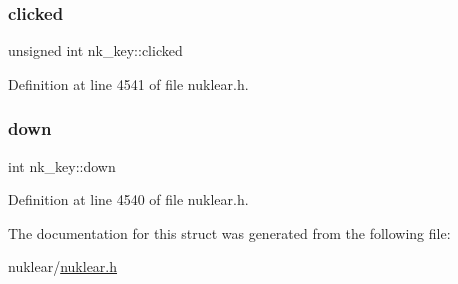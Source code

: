 \subsubsection{\texorpdfstring{clicked}{clicked}}
{\footnotesize\ttfamily unsigned int nk\+\_\+key\+::clicked}



Definition at line 4541 of file nuklear.\+h.

\mbox{\label{structnk__key_ad31180f5548bfca7a9998de792ef96b2}} 
\subsubsection{\texorpdfstring{down}{down}}
{\footnotesize\ttfamily int nk\+\_\+key\+::down}



Definition at line 4540 of file nuklear.\+h.



The documentation for this struct was generated from the following file\+:\begin{DoxyCompactItemize}
\item 
nuklear/\mbox{\hyperlink{nuklear_8h}{nuklear.\+h}}\end{DoxyCompactItemize}
